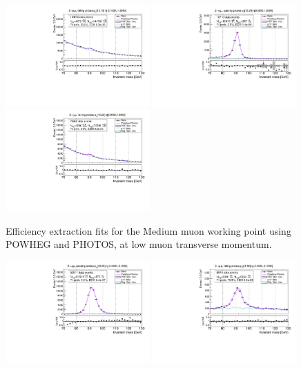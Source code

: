 {\begin{figure}
\includegraphics[width=0.49\textwidth]{figures/Zmm_PowhegPhotos_BkgLPi_fail_ptBin0_etaBin1.pdf}
\includegraphics[width=0.49\textwidth]{figures/Zmm_PowhegPhotos_BkgLPi_pass_ptBin1_etaBin9.pdf}
\includegraphics[width=0.49\textwidth]{figures/Zmm_PowhegPhotos_BkgLPi_fail_ptBin1_etaBin9.pdf}
\caption{Efficiency extraction fits for the Medium muon working point using POWHEG and PHOTOS, at low muon transverse momentum.}
\label{fig:ZmmAltSigFSRFits3}
\end{figure}
\begin{figure}
\centering
\includegraphics[width=0.49\textwidth]{figures/Zmm_PowhegPhotos_BkgLPi_pass_ptBin7_etaBin0.pdf}
\includegraphics[width=0.49\textwidth]{figures/Zmm_PowhegPhotos_BkgLPi_fail_ptBin7_etaBin0.pdf}

\end{figure}}
